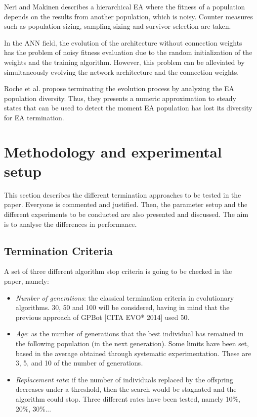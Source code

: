 \documentclass[runningheads,a4paper]{llncs}
\begin{document}
Neri and Makinen \cite{Neri2007} describes a hierarchical EA where the fitness of a population depends on the results from another population, which is noisy. Counter measures such as population sizing, sampling sizing and survivor selection are taken.

In the ANN field, the evolution of the architecture without connection weights has the problem of noisy fitness evaluation \cite{Zhang2011} due to the random initialization of the weights and the training algorithm. However, this problem can be alleviated by simultaneously evolving the network architecture and the connection weights.



Roche et al. \cite{RocheTermination13} propose terminating the evolution process by analyzing the EA population diversity. Thus, they presents a numeric approximation to steady states that can be used to detect the moment EA population has lost its diversity for EA termination.



\section{Methodology and experimental setup}
\label{sec:met}

This section describes the different termination approaches to be tested in the paper. Everyone is commented and justified.
Then, the parameter setup and the different experiments to be conducted are also presented and discussed. The aim is to analyse the differences in performance.

\subsection{Termination Criteria}
A set of three different algorithm stop criteria is going to be checked in the paper, namely:
\begin{itemize}
    \item \textit{Number of generations}: the classical termination criteria in evolutionary algorithms. 30, 50 and 100 will be considered, having in mind that the previous approach of GPBot [CITA EVO* 2014] used 50.
    \item \textit{Age}: as the number of generations that the best individual has remained in the following population (in the next generation). Some limits have been set, based in the average obtained through systematic experimentation. These are 3, 5, and 10 of the number of generations.
    \item \textit{Replacement rate}: if the number of individuals replaced by the offspring decreases under a threshold, then the search would be stagnated and the algorithm could stop. Three different rates have been tested, namely 10\%, 20\%, 30\%...
\end{itemize}
\end{document}
